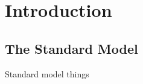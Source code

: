 \chapter{Introduction\label{ch:intro}}

\section{The Standard Model\label{sec:SM}}

Standard model things \cite{dalton}
